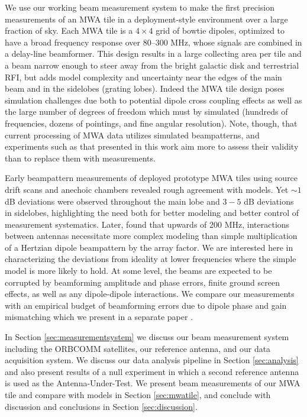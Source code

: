 We use our working beam measurement system to make the first precision measurements of an MWA tile in a deployment-style environment over a large fraction of sky. Each MWA tile is a $4\times4$ grid of bowtie dipoles, optimized to have a broad frequency response over 80--300 MHz, whose signals are combined in a delay-line beamformer. This design results in a large collecting area per tile and a beam narrow enough to steer away from the bright galactic disk and terrestrial RFI, but adds model complexity and uncertainty near the edges of the main beam and in the sidelobes (grating lobes). Indeed the MWA tile design poses simulation challenges due both to potential dipole cross coupling effects as well as the large number of degrees of freedom which must by simulated (hundreds of frequencies, dozens of pointings, and fine angular resolution). Note, though, that current processing of MWA data utilizes simulated beampatterns, and experiments such as that presented in this work aim more to assess their validity than to replace them with measurements.

Early beampattern measurements of deployed prototype MWA tiles using source drift scans \citep{bowman07} and anechoic chambers \citep{williamsthesis2012} revealed rough agreement with models. Yet $\sim1$ dB deviations were observed throughout the main lobe and $3-5$ dB deviations in sidelobes, highlighting the need both for better modeling and better control of measurement systematics. Later, \citet{sutinjo15} found that upwards of 200 MHz, interactions between antennas necessitate more complex modeling than simple multiplication of a Hertzian dipole beampattern by the array factor. We are interested here in characterizing the deviations from ideality at lower frequencies where the simple model is more likely to hold. At some level, the beams are expected to be corrupted by beamforming amplitude and phase errors, finite ground screen effects, as well as any dipole-dipole interactions. We compare our measurements with an empirical budget of beamforming errors due to dipole phase and gain mismatching which we present in a separate paper \citep{neben16}.

In Section \ref{sec:measurementsystem} we discuss our beam measurement system including the ORBCOMM satellites, our reference antenna, and our data acquisition system. We discuss our data analysis pipeline in Section \ref{sec:analysis} and also present results of a null experiment in which a second reference antenna is used as the Antenna-Under-Test. We present beam measurements of our MWA tile and compare with models in Section \ref{sec:mwatile}, and conclude with discussion and conclusions in Section \ref{sec:discussion}.

